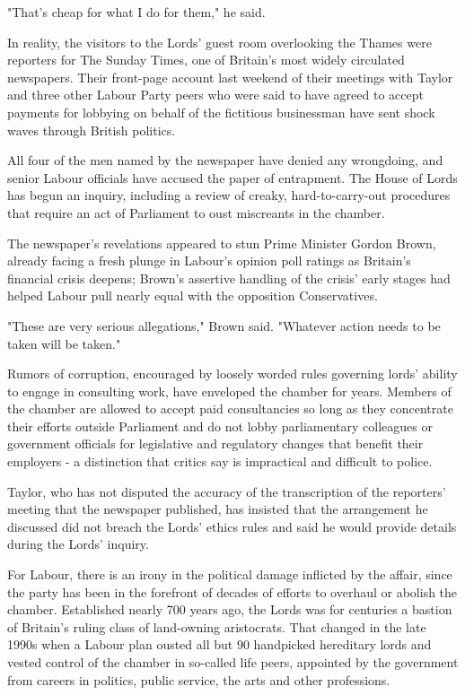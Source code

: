 "That's cheap for what I do for them," he said.

In reality, the visitors to the Lords' guest room overlooking the Thames
were reporters for The Sunday Times, one of Britain's most widely
circulated newspapers. Their front-page account last weekend of their
meetings with Taylor and three other Labour Party peers who were said to
have agreed to accept payments for lobbying on behalf of the fictitious
businessman have sent shock waves through British politics.

All four of the men named by the newspaper have denied any wrongdoing,
and senior Labour officials have accused the paper of entrapment. The
House of Lords has begun an inquiry, including a review of creaky,
hard-to-carry-out procedures that require an act of Parliament to oust
miscreants in the chamber.

The newspaper's revelations appeared to stun Prime Minister Gordon
Brown, already facing a fresh plunge in Labour's opinion poll ratings as
Britain's financial crisis deepens; Brown's assertive handling of the
crisis' early stages had helped Labour pull nearly equal with the
opposition Conservatives.

"These are very serious allegations," Brown said. "Whatever action needs
to be taken will be taken."

Rumors of corruption, encouraged by loosely worded rules governing
lords' ability to engage in consulting work, have enveloped the chamber
for years. Members of the chamber are allowed to accept paid
consultancies so long as they concentrate their efforts outside
Parliament and do not lobby parliamentary colleagues or government
officials for legislative and regulatory changes that benefit their
employers - a distinction that critics say is impractical and difficult
to police.

Taylor, who has not disputed the accuracy of the transcription of the
reporters' meeting that the newspaper published, has insisted that the
arrangement he discussed did not breach the Lords' ethics rules and said
he would provide details during the Lords' inquiry.

For Labour, there is an irony in the political damage inflicted by the
affair, since the party has been in the forefront of decades of efforts
to overhaul or abolish the chamber. Established nearly 700 years ago,
the Lords was for centuries a bastion of Britain's ruling class of
land-owning aristocrats. That changed in the late 1990s when a Labour
plan ousted all but 90 handpicked hereditary lords and vested control of
the chamber in so-called life peers, appointed by the government from
careers in politics, public service, the arts and other professions.

